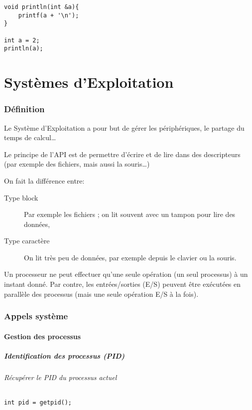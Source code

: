 \documentclass[10pt,a4paper,french]{article}
\let\oldpart\part
\renewcommand\part{\newpage\oldpart}
\begin{document}
\begin{verbatim}
void println(int &a){
    printf(a + '\n');
}

int a = 2;
println(a);
\end{verbatim}

\part{Systèmes d'Exploitation}

\section{Définition}

Le Système d'Exploitation a pour but de gérer les périphériques, le partage du temps de calcul\ldots

Le principe de l'API est de permettre d'écrire et de lire dans des descripteurs (par exemple des fichiers, mais aussi la souris\ldots)

On fait la différence entre:
\begin{description}
\item[Type block] Par exemple les fichiers ; on lit souvent avec un tampon pour lire des données,
\item[Type caractère] On lit très peu de données, par exemple depuis le clavier ou la souris.
\end{description}

Un processeur ne peut effectuer qu'une seule opération (un seul processus) à un instant donné. Par contre, les entrées/sorties (E/S) peuvent être exécutées en parallèle des processus (mais une seule opération E/S à la fois).

\section{Appels système}

\subsection{Gestion des processus}

\subsubsection{Identification des processus (PID)}

\paragraph{Récupérer le PID du processus actuel}
\begin{verbatim}
int pid = getpid();
\end{verbatim}
\end{document}
